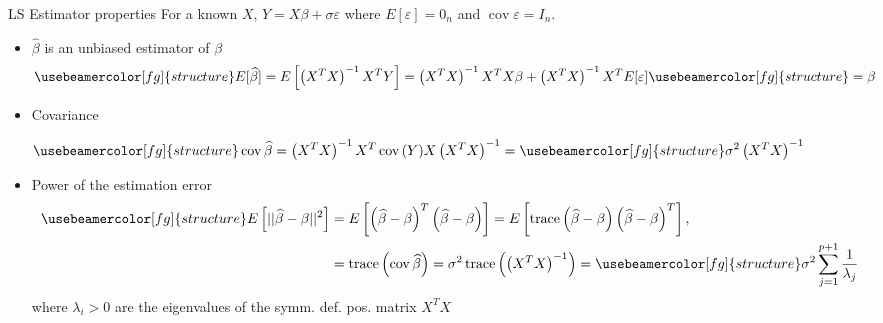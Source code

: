 \documentclass[compress, smaller, serif, 9pt]{beamer}
\newcommand{\structuretext}[1]{{\usebeamercolor[fg]{structure} #1}}
\DeclareMathOperator{\cov}{cov}
\DeclareMathOperator{\trace}{trace}
\begin{document}
\begin{frame}{LS Estimator properties}
For a known $X$, $Y= X \beta + \sigma \varepsilon$ where $E[\varepsilon]=0_n$ and $\cov{\varepsilon}=I_n$.
\begin{itemize}
 \item  $\widehat{\beta}$ is an unbiased estimator of $\beta$
  \begin{align*}
   \structuretext{E[\widehat{\beta}]} &= E \left[ \left( X^T X \right)^{-1} X^T Y \right]= \left( X^T X \right)^{-1} X^T X \beta +  \left( X^T X \right)^{-1} X^T E[\varepsilon] \structuretext{= \beta}
  \end{align*}
\item Covariance \medskip

  $\begin{displaystyle}
   \structuretext{\cov{\widehat{\beta}}}= \left( X^T X \right)^{-1} X^T \cov{(Y)} X \left( X^T X \right)^{-1} 
   = \structuretext{\sigma^2 \left( X^T X \right)^{-1}}
  \end{displaystyle}$\medskip
\item Power of the estimation error
  \begin{align*}
    \structuretext{E\left[|| \widehat{\beta} - \beta ||^2\right]}&=  E\left[ { \left(\widehat{\beta} - \beta\right)^T \left(\widehat{\beta} - \beta\right) } \right]  
     = E\left[ \trace{ \left(\widehat{\beta} - \beta\right) \left(\widehat{\beta} - \beta\right)^T } \right],\\
    &= \trace{ \left( \cov{\widehat{\beta}} \right) } =  \sigma^2 \trace{\left( \left( X^T X \right)^{-1} \right)}= \structuretext{ \sigma^2 \sum_{j=1}^{p+1} \frac{1}{\lambda_j} }
  \end{align*}
  where  $\lambda_i > 0$ are the eigenvalues of the symm. def. pos. matrix  $X^T X$
 \end{itemize}

 
\end{frame}
\end{document}
